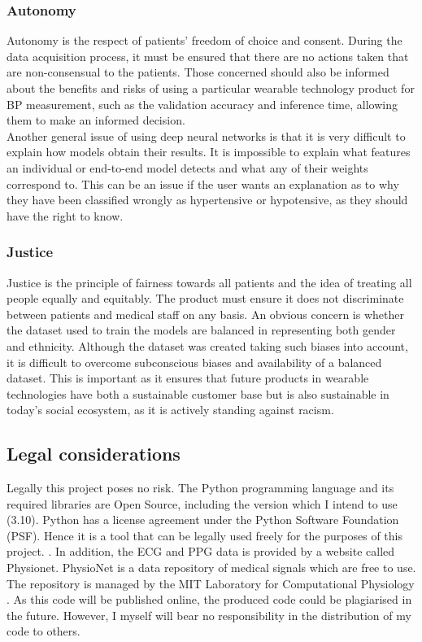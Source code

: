 \subsubsection{Autonomy}
Autonomy is the respect of patients' freedom of choice and consent. During 
the data acquisition process, it must be ensured that there are no actions 
taken that are non-consensual to the patients. Those concerned should also 
be informed about the benefits and risks of using a particular wearable 
technology product for BP measurement, such as the validation accuracy 
and inference time, allowing them to make an informed decision. \\ \newline \noindent Another 
general issue of using deep neural networks is that it is very difficult to explain how 
models obtain their results. It is impossible to explain what features an individual 
or end-to-end model detects and what any of their weights correspond to. 
This can be an issue if the user wants an explanation as to why they have 
been classified wrongly as hypertensive or hypotensive, as they should have the right to know.

\subsubsection{Justice}
Justice is the principle of fairness towards all patients and the idea of treating 
all people equally and equitably. The product must ensure it does not discriminate 
between patients and medical staff on any basis. An obvious concern is 
whether the dataset used to train the models are balanced in representing 
both gender and ethnicity. Although the dataset was created taking such biases 
into account, it is difficult to overcome subconscious biases and availability 
of a balanced dataset. This is important as it ensures that future products in 
wearable technologies have both a sustainable customer base but is also sustainable 
in today's social ecosystem, as it is actively standing against racism.

\subsection{Legal considerations}
Legally this project poses no risk. The Python programming language and its required 
libraries are Open Source, including the version which I intend to use (3.10). Python 
has a license agreement under the Python Software Foundation (PSF). Hence it is a tool 
that can be legally used freely for the purposes of this project. \cite{Python}. In 
addition, the ECG and PPG data is provided by a website called Physionet. PhysioNet 
is a data repository of medical signals which are free to use. The repository is 
managed by the MIT Laboratory for Computational 
Physiology \cite{Goldberger2000} \cite{Physionet}. As this code will be published 
online, the produced code could be plagiarised in the future. However, I myself will 
bear no responsibility in the distribution of my code to others.

